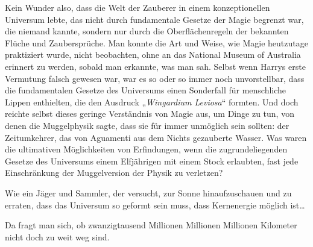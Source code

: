 Kein Wunder also, dass die Welt der Zauberer in einem konzeptionellen Universum lebte, das nicht durch fundamentale Gesetze der Magie begrenzt war, die niemand kannte, sondern nur durch die Oberflächenregeln der bekannten Flüche und Zaubersprüche. Man konnte die Art und Weise, wie Magie heutzutage praktiziert wurde, nicht beobachten, ohne an das National Museum of Australia erinnert zu werden, sobald man erkannte, was man sah. Selbst wenn Harrys erste Vermutung falsch gewesen war, war es so oder so immer noch unvorstellbar, dass die fundamentalen Gesetze des Universums einen Sonderfall für menschliche Lippen enthielten, die den Ausdruck „\emph{Wingardium Leviosa}“ formten. Und doch reichte selbst dieses geringe Verständnis von Magie aus, um Dinge zu tun, von denen die Muggelphysik sagte, dass sie für immer unmöglich sein sollten: der Zeitumkehrer, das von Aguamenti aus dem Nichts gezauberte Wasser. Was waren die ultimativen Möglichkeiten von Erfindungen, wenn die zugrundeliegenden Gesetze des Universums einem Elfjährigen mit einem Stock erlaubten, fast jede Einschränkung der Muggelversion der Physik zu verletzen?

Wie ein Jäger und Sammler, der versucht, zur Sonne hinaufzuschauen und zu erraten, dass das Universum so geformt sein muss, dass Kernenergie möglich ist…

Da fragt man sich, ob zwanzigtausend Millionen Millionen Millionen Kilometer nicht doch zu weit weg sind.

